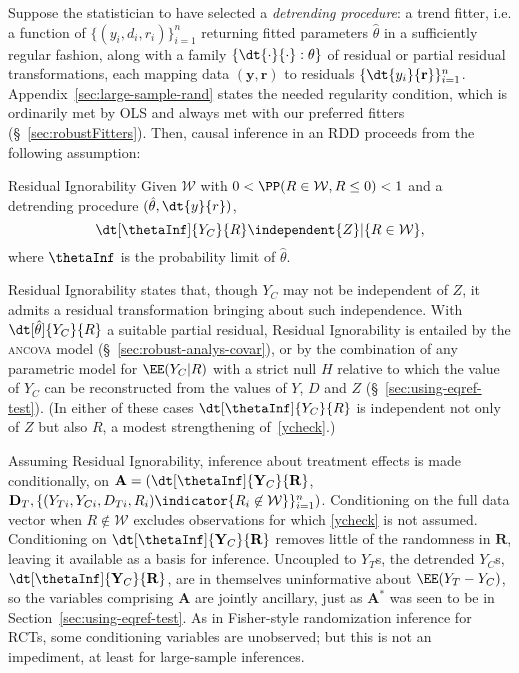 Suppose the statistician to have selected a \textit{detrending procedure}: a
trend fitter, i.e. a function of
$\{({y}_{i},d_{i},r_{i})\}_{i=1}^{n}$ returning
fitted parameters $\hat{\theta}$ in a sufficiently regular
fashion, along with a
family $\{\dt{\cdot}{\cdot}: \theta\}$ of residual or partial
residual transformations, each mapping data $(\mathbf{y}, \mathbf{r})$ to
residuals
$\{\dt {y_{i}}{\mathbf{r}} \}_{i=1}^{n}$.
Appendix~\ref{sec:large-sample-rand}
states the
needed regularity condition, which is ordinarily met by OLS and always
met with our preferred fitters (\S~\ref{sec:robustFitters}).
Then, causal inference in an RDD proceeds from the following assumption:
\begin{ass}{Residual Ignorability}
\sloppy
Given $\mathcal{W}$ with $0< \PP( R \in
\mathcal{W}, R\leq 0) < 1$ and a detrending procedure $(\hat{\theta}, \dt{y}{r})$,
\begin{equation}\label{ycheck}
\dt[\thetaInf]{Y_{C}}{ R }%
\independent {Z}| \{R \in \mathcal{W}\},
\end{equation}
where $\thetaInf$ is the probability limit of $\hat\theta$.
\end{ass}
Residual Ignorability states that, though $Y_C$ may not be independent of
$Z$,  it admits a residual transformation bringing about such
independence. With $\dt[\hat\theta]{Y_{C}}{ R}$ a suitable
partial residual, Residual Ignorability is entailed by the
\textsc{ancova} model (\S~\ref{sec:robust-analys-covar}), or by the combination of any parametric model
for $\EE (Y_{C}| R)$ with a strict null $H$ relative to which the
value of $Y_{C}$ can be reconstructed from the values of $Y$, $D$ and
$Z$ (\S~\ref{sec:using-eqref-test}).
(In either of these cases $\dt[\thetaInf]{Y_{C}}{ R}$
is independent not only of $Z$ but also $R$,
a modest strengthening of~\eqref{ycheck}.)


\sloppy
Assuming Residual Ignorability, inference about treatment effects is
made conditionally, on
$\mathbf{A}= (\dt[\thetaInf]{\mathbf{Y}_{C}}{ \mathbf{R}}$, $\mathbf{D}_{T},
\{(Y_{Ti}, Y_{Ci}, D_{Ti}, R_{i}) \indicator{{R}_{i} \not\in
  \mathcal{W}}\}_{i=1}^{n})$.
Conditioning on the full data vector when $R \not\in \mathcal{W}$
excludes observations for which \eqref{ycheck} is not assumed.
Conditioning on
$\dt[\thetaInf]{\mathbf{Y}_{C}}{ \mathbf{R}}$
removes little of the randomness %
in $\mathbf{R}$, leaving it available as a basis for inference.
Uncoupled to $Y_{T}$s, the detrended  $Y_{C}$s,
$\dt[\thetaInf]{\mathbf{Y}_{C}}{ \mathbf{R}}$,
are in themselves uninformative about $\EE(Y_{T} - Y_{C})$, so
the variables comprising $\mathbf{A}$ are jointly
ancillary, just as $\bm{A}^*$ %
was seen to be
in Section~\ref{sec:using-eqref-test}.  As in Fisher-style randomization inference for RCTs, some conditioning variables are
unobserved; but this is not an impediment, at least for large-sample
inferences.

